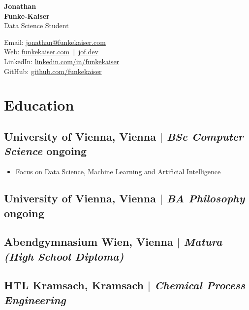 \documentclass[11pt]{article}
\begin{document}
\begin{center}
	\begin{minipage}{0.5\textwidth}
		{\Huge\bfseries Jonathan \\[2pt] Funke-Kaiser} \\ \medskip
		Data Science Student
	\end{minipage} \hfill
	\begin{minipage}{0.45\textwidth}
		\raggedleft
		Email: \href{mailto:jonathan@funkekaiser.com}{jonathan@funkekaiser.com} \\
		Web: \href{https://funkekaiser.com}{funkekaiser.com} $\,|\,$ \href{https://jof.dev}{jof.dev} \\
		LinkedIn: \href{https://linkedin.com/in/funkekaiser}{linkedin.com/in/funkekaiser} \\
		GitHub: \href{https://github.com/funkekaiser}{github.com/funkekaiser}
	\end{minipage}
\end{center}

\section{Education}
\subsection{University of Vienna, Vienna $|$ {\normalfont\itshape BSc Computer Science} \hfill ongoing}
\begin{itemize}
	\item Focus on Data Science, Machine Learning and Artificial Intelligence
\end{itemize}
\vspace{-8pt}
\subsection{University of Vienna, Vienna $|$ {\normalfont\itshape BA Philosophy} \hfill ongoing}
\vspace{12pt}
\subsection{Abendgymnasium Wien, Vienna $|$ {\normalfont\itshape Matura (High School Diploma)}}
\subsection{HTL Kramsach, Kramsach $|$ {\normalfont\itshape Chemical Process Engineering}}
\vspace{12pt}
\end{document}
